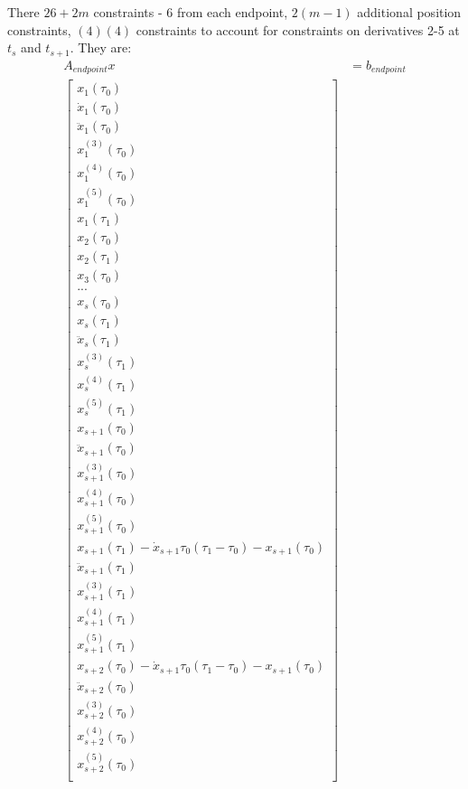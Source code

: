 \documentclass[11pt]{article}
\begin{document}
\mbox{} \newline
There $26+2m$ constraints - 6 from each endpoint, $2(m-1)$ additional position constraints, $(4)(4)$ constraints to account for constraints on derivatives 2-5 at $t_{s}$ and $t_{s+1}$.  They are: 
\begin{align}
\nonumber A_{endpoint} x &= b_{endpoint} \\
\label{eqn: endpoint} \begin{bmatrix}
x_1(\tau_0) \\
\dot{x}_1 (\tau_0) \\
\ddot{x}_1 (\tau_0) \\
x^{(3)}_1 (\tau_0) \\
x^{(4)}_1 (\tau_0) \\
x^{(5)}_1 (\tau_0) \\
x_1 (\tau_1) \\
x_2 (\tau_0) \\
x_2 (\tau_1) \\
x_3 (\tau_0) \\ 
... \\
x_{s} (\tau_0) \\
x_{s} (\tau_1) \\
\ddot{x}_{s} (\tau_1) \\
x^{(3)}_{s} (\tau_1) \\
x^{(4)}_{s} (\tau_1) \\
x^{(5)}_{s} (\tau_1) \\
x_{s+1} (\tau_0) \\
\ddot{x}_{s+1} (\tau_0) \\
x^{(3)}_{s+1} (\tau_0) \\
x^{(4)}_{s+1} (\tau_0) \\
x^{(5)}_{s+1} (\tau_0) \\
x_{s+1} (\tau_1) - \dot{x}_{s+1}{\tau_0}(\tau_1-\tau_0) - x_{s+1}(\tau_0) \\
\ddot{x}_{s+1} (\tau_1) \\
x^{(3)}_{s+1} (\tau_1) \\
x^{(4)}_{s+1} (\tau_1) \\
x^{(5)}_{s+1} (\tau_1) \\
x_{s+2} (\tau_0) - \dot{x}_{s+1}{\tau_0}(\tau_1-\tau_0) - x_{s+1}(\tau_0)\\
\ddot{x}_{s+2} (\tau_0) \\
x^{(3)}_{s+2} (\tau_0) \\
x^{(4)}_{s+2} (\tau_0) \\
x^{(5)}_{s+2} (\tau_0)  \\

\end{bmatrix}
\end{align}
\end{document}
